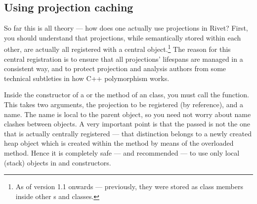 \documentclass{JHEP3}
\begin{document}
\subsection{Using projection caching}
So far this is all theory --- how does one actually use projections in Rivet?
First, you should understand that projections, while semantically stored within
each other, are actually all registered with a central 
object.\footnote{As of version 1.1 onwards --- previously, they were stored as
  class members inside other s and  classes.}
The reason for this central registration is to ensure that all projections'
lifespans are managed in a consistent way, and to protect projection and
analysis authors from some technical subtleties in how C++ polymorphism works.

Inside the constructor of a  or the  method of an
 class, you must
call the  function. This takes two arguments, the projection
to be registered (by  reference), and a name. The name is local to
the parent object, so you need not worry about name clashes between objects. A
very important point is that the passed  is not the one that is
actually centrally registered --- that distinction belongs to a newly created
heap object which is created within the  method by means of
the overloaded  method. Hence it is completely safe
--- and recommended --- to use only local (stack) objects in 
and  constructors.
\end{document}
